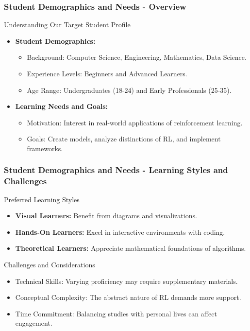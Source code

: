 \documentclass[aspectratio=169]{beamer}
\begin{document}
\begin{frame}[fragile]
    \frametitle{Student Demographics and Needs - Overview}
    \begin{block}{Understanding Our Target Student Profile}
        \begin{itemize}
            \item \textbf{Student Demographics:}
                \begin{itemize}
                    \item Background: Computer Science, Engineering, Mathematics, Data Science.
                    \item Experience Levels: Beginners and Advanced Learners.
                    \item Age Range: Undergraduates (18-24) and Early Professionals (25-35).
                \end{itemize}
            \item \textbf{Learning Needs and Goals:}
                \begin{itemize}
                    \item Motivation: Interest in real-world applications of reinforcement learning.
                    \item Goals: Create models, analyze distinctions of RL, and implement frameworks.
                \end{itemize}
        \end{itemize}
    \end{block}
\end{frame}

\begin{frame}[fragile]
    \frametitle{Student Demographics and Needs - Learning Styles and Challenges}
    \begin{block}{Preferred Learning Styles}
        \begin{itemize}
            \item \textbf{Visual Learners:} Benefit from diagrams and visualizations.
            \item \textbf{Hands-On Learners:} Excel in interactive environments with coding.
            \item \textbf{Theoretical Learners:} Appreciate mathematical foundations of algorithms.
        \end{itemize}
    \end{block}
    
    \begin{block}{Challenges and Considerations}
        \begin{itemize}
            \item Technical Skills: Varying proficiency may require supplementary materials.
            \item Conceptual Complexity: The abstract nature of RL demands more support.
            \item Time Commitment: Balancing studies with personal lives can affect engagement.
        \end{itemize}
    \end{block}
\end{frame}
\end{document}
